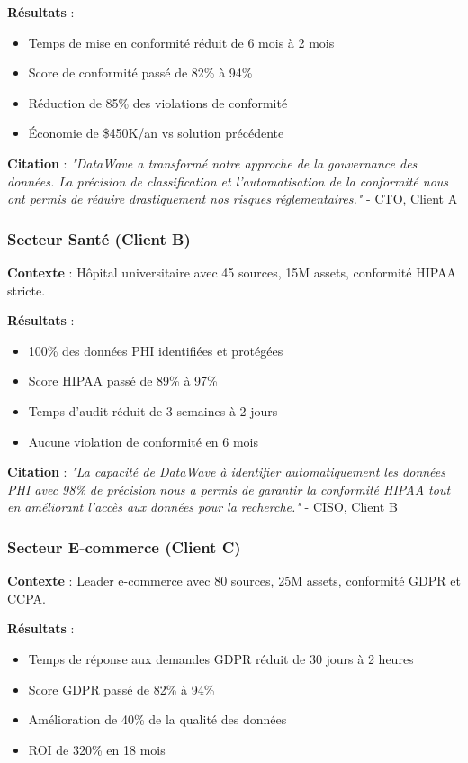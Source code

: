 \textbf{Résultats} :
\begin{itemize}
    \item Temps de mise en conformité réduit de 6 mois à 2 mois
    \item Score de conformité passé de 82\% à 94\%
    \item Réduction de 85\% des violations de conformité
    \item Économie de \$450K/an vs solution précédente
\end{itemize}

\textbf{Citation} : \textit{"DataWave a transformé notre approche de la gouvernance des données. La précision de classification et l'automatisation de la conformité nous ont permis de réduire drastiquement nos risques réglementaires."} - CTO, Client A

\subsubsection{Secteur Santé (Client B)}

\textbf{Contexte} : Hôpital universitaire avec 45 sources, 15M assets, conformité HIPAA stricte.

\textbf{Résultats} :
\begin{itemize}
    \item 100\% des données PHI identifiées et protégées
    \item Score HIPAA passé de 89\% à 97\%
    \item Temps d'audit réduit de 3 semaines à 2 jours
    \item Aucune violation de conformité en 6 mois
\end{itemize}

\textbf{Citation} : \textit{"La capacité de DataWave à identifier automatiquement les données PHI avec 98\% de précision nous a permis de garantir la conformité HIPAA tout en améliorant l'accès aux données pour la recherche."} - CISO, Client B

\subsubsection{Secteur E-commerce (Client C)}

\textbf{Contexte} : Leader e-commerce avec 80 sources, 25M assets, conformité GDPR et CCPA.

\textbf{Résultats} :
\begin{itemize}
    \item Temps de réponse aux demandes GDPR réduit de 30 jours à 2 heures
    \item Score GDPR passé de 82\% à 94\%
    \item Amélioration de 40\% de la qualité des données
    \item ROI de 320\% en 18 mois
\end{itemize}

